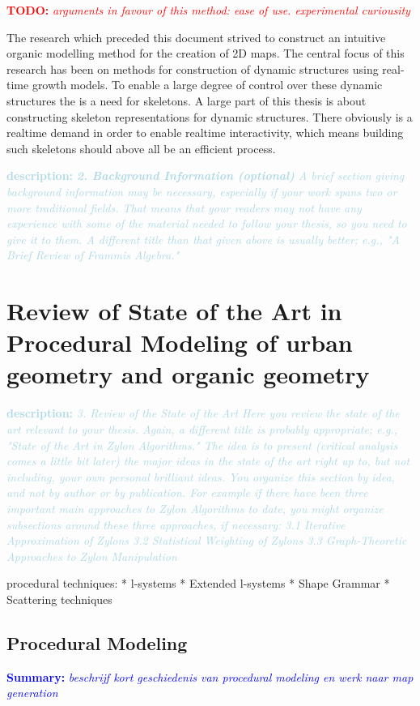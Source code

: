 \documentclass{article}
\newcommand{\todo}[1]{\textcolor{red}{\textbf{\newline TODO: }\it{#1} \newline}}
\newcommand{\inhoud}[1]{\textcolor{blue}{\textbf{\newline Summary: }\it{#1}}}
\newcommand{\desc}[1]{\textcolor{lightblue}{\textbf{\newline description: }\it{#1} \newline}}
\begin{document}
\todo{arguments in favour of this method: ease of use. experimental curiousity}

The research which preceded this document strived to construct an intuitive organic modelling method for the creation of 2D maps. The central focus of this research has been on methods for construction of dynamic structures using real-time growth models. To enable a large degree of control over these dynamic structures the is a need for skeletons. 
A large part of this thesis is about constructing skeleton representations for dynamic structures. There obviously is a realtime demand in order to enable realtime interactivity, which means building such skeletons should above all be an efficient process.    

\desc{\textbf{2. Background Information (optional)}
A brief section giving background information may be necessary, especially if your work spans two or more traditional fields. That means that your readers may not have any experience with some of the material needed to follow your thesis, so you need to give it to them. A different title than that given above is usually better; e.g., "A Brief Review of Frammis Algebra." 
}

\section{Review of State of the Art in Procedural Modeling of urban geometry and organic geometry}

\desc{
3. Review of the State of the Art
Here you review the state of the art relevant to your thesis. Again, a different title is probably appropriate; e.g., "State of the Art in Zylon Algorithms." The idea is to present (critical analysis comes a little bit later) the major ideas in the state of the art right up to, but not including, your own personal brilliant ideas.
You organize this section by idea, and not by author or by publication. For example if there have been three important main approaches to Zylon Algorithms to date, you might organize subsections around these three approaches, if necessary:
3.1 Iterative Approximation of Zylons
3.2 Statistical Weighting of Zylons
3.3 Graph-Theoretic Approaches to Zylon Manipulation 
}

procedural techniques: 
* l-systems
* Extended l-systems
* Shape Grammar
* Scattering techniques

\subsection{Procedural Modeling}
\inhoud{beschrijf kort geschiedenis van procedural modeling en werk naar map generation}
\end{document}
